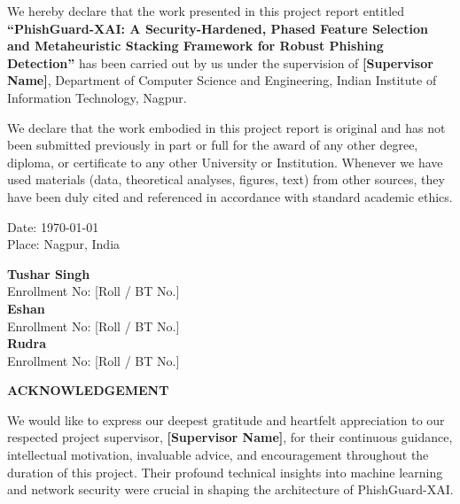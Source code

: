 \documentclass[12pt,a4paper,oneside]{report}
\begin{document}
We hereby declare that the work presented in this project report entitled \textbf{``PhishGuard-XAI: A Security-Hardened, Phased Feature Selection and Metaheuristic Stacking Framework for Robust Phishing Detection''} has been carried out by us under the supervision of \textbf{[Supervisor Name]}, Department of Computer Science and Engineering, Indian Institute of Information Technology, Nagpur.

We declare that the work embodied in this project report is original and has not been submitted previously in part or full for the award of any other degree, diploma, or certificate to any other University or Institution. Whenever we have used materials (data, theoretical analyses, figures, text) from other sources, they have been duly cited and referenced in accordance with standard academic ethics.\\[2.0cm]

\noindent
\begin{minipage}{0.4\textwidth}
    Date: \today\\
    Place: Nagpur, India
\end{minipage}
\hfill
\begin{minipage}{0.55\textwidth}
    \begin{flushright}
        \textbf{Tushar Singh}\\
        Enrollment No: [Roll / BT No.]\\[0.25cm]
        \textbf{Eshan}\\
        Enrollment No: [Roll / BT No.]\\[0.25cm]
        \textbf{Rudra}\\
        Enrollment No: [Roll / BT No.]
    \end{flushright}
\end{minipage}

\newpage
\thispagestyle{plain}
\begin{center}
    {\LARGE \textbf{ACKNOWLEDGEMENT}}\\[1.0cm]
\end{center}

We would like to express our deepest gratitude and heartfelt appreciation to our respected project supervisor, \textbf{[Supervisor Name]}, for their continuous guidance, intellectual motivation, invaluable advice, and encouragement throughout the duration of this project. Their profound technical insights into machine learning and network security were crucial in shaping the architecture of PhishGuard-XAI.
\end{document}
